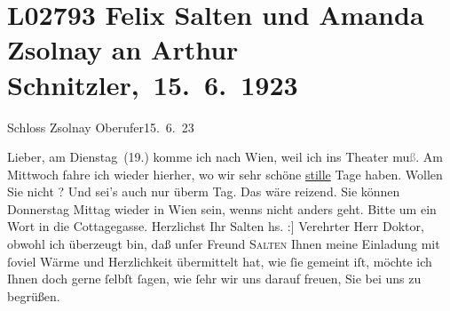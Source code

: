 

\section[ Felix Salten und Amanda Zsolnay an Arthur Schnitzler, 15. 6. 1923]{L02793 Felix Salten und Amanda Zsolnay an Arthur Schnitzler, 15. 6. 1923}
\nopagebreak{}
\rehead{ }\normalsize\beginnumbering{}
\toendnotes[C]{\smallbreak\pagebreak[2]}
\toendnotes[C]{\smallbreak}
\pstart
           \noindent{}\centering{}{\pb}{[}Schloss Zsolnay\oindex{Schloss Csáky@\textbf{Schloss Csáky}, \emph{Schloss (K.SLS)}|pw}{]}\pend
           \vspace{1em}
\pstart
           \raggedleft{}{\pb}Oberufer15. 6. 23\pend
           
\pstart{}Lieber,\pend\vspace{0.5em}
\pstart
           am Dienstag (19.) komme ich nach Wien, weil ich ins Theater mu\textcolor{gray}{ß}. Am Mittwoch fahre ich wieder hierher, wo wir sehr schöne \uline{stille} Tage haben. Wollen Sie nicht \label{K_L02793-1v}\label{K_L02793-1}?
               Und sei’s auch nur überm Tag. Das wäre reizend. Sie können Donnerstag{ }Mittag wieder in Wien sein, wenns
               nicht anders geht. Bitte um ein Wort in die Cottagegasse.\pend
           \pstart Herzlichst Ihr \spacefill\mbox{Salten}\pend{}\vspace{1em}{\vspace{1\baselineskip}}
\pstart{}{[}hs. :{]} Verehrter Herr Doktor,\pend\vspace{0.5em}
\pstart
           obwohl ich überzeugt bin, daß unſer Freund \textsc{Salten} Ihnen
               meine Einladung mit ſoviel Wärme und Herzlichkeit übermittelt hat, wie ſie gemeint
               iſt, möchte ich Ihnen doch gerne ſelbſt ſagen, wie ſehr {\pb}wir uns darauf freuen, Sie bei
               uns zu begrüßen.\pend
           
